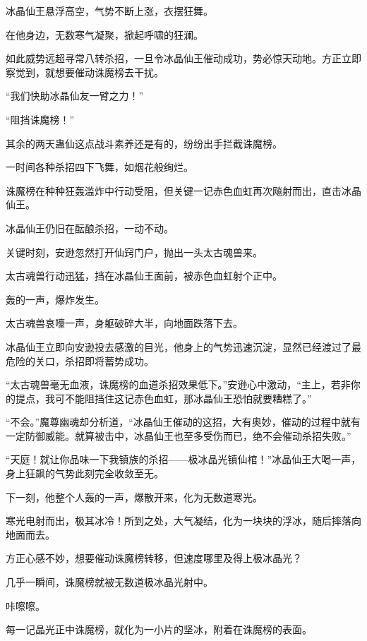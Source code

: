 
\begin{this_body}

冰晶仙王悬浮高空，气势不断上涨，衣摆狂舞。

在他身边，无数寒气凝聚，掀起呼啸的狂澜。

如此威势远超寻常八转杀招，一旦令冰晶仙王催动成功，势必惊天动地。方正立即察觉到，就想要催动诛魔榜去干扰。

“我们快助冰晶仙友一臂之力！”

“阻挡诛魔榜！”

其余的两天蛊仙这点战斗素养还是有的，纷纷出手拦截诛魔榜。

一时间各种杀招四下飞舞，如烟花般绚烂。

诛魔榜在种种狂轰滥炸中行动受阻，但关键一记赤色血虹再次飚射而出，直击冰晶仙王。

冰晶仙王仍旧在酝酿杀招，一动不动。

关键时刻，安逊忽然打开仙窍门户，抛出一头太古魂兽来。

太古魂兽行动迅猛，挡在冰晶仙王面前，被赤色血虹射个正中。

轰的一声，爆炸发生。

太古魂兽哀嚎一声，身躯破碎大半，向地面跌落下去。

冰晶仙王立即向安逊投去感激的目光，他身上的气势迅速沉淀，显然已经渡过了最危险的关口，杀招即将蓄势成功。

“太古魂兽毫无血液，诛魔榜的血道杀招效果低下。”安逊心中激动，“主上，若非你的提点，我可不能阻挡住这记赤色血虹，那冰晶仙王恐怕就要糟糕了。”

“不会。”魔尊幽魂却分析道，“冰晶仙王催动的这招，大有奥妙，催动的过程中就有一定防御威能。就算被击中，冰晶仙王也至多受伤而已，绝不会催动杀招失败。”

“天庭！就让你品味一下我镇族的杀招——极冰晶光镇仙棺！”冰晶仙王大喝一声，身上狂飙的气势此刻完全收敛至无。

下一刻，他整个人轰的一声，爆散开来，化为无数道寒光。

寒光电射而出，极其冰冷！所到之处，大气凝结，化为一块块的浮冰，随后摔落向地面而去。

方正心感不妙，想要催动诛魔榜转移，但速度哪里及得上极冰晶光？

几乎一瞬间，诛魔榜就被无数道极冰晶光射中。

咔嚓嚓。

每一记晶光正中诛魔榜，就化为一小片的坚冰，附着在诛魔榜的表面。


\end{this_body}
